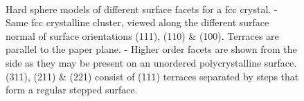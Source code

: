 \begin{figure}\centering
	 \quad%
	 \quad%
	 \\
	 \quad%
	 \quad%
	\quad
	\caption{Hard sphere models of different surface facets for a fcc crystal. - Same fcc crystalline cluster, viewed along the different surface normal of surface orientations (111), (110) \& (100). Terraces are parallel to the paper plane. - Higher order facets are shown from the side as they may be present on an unordered polycrystalline surface. (311), (211) \& (221) consist of (111) terraces separated by steps that form a regular stepped surface.
}
\end{figure}

